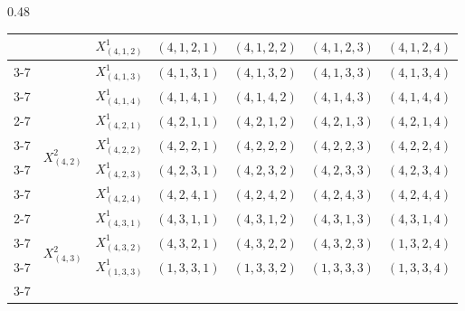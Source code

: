 \documentclass[12pt]{article}
\begin{document}
\begin{table}[p]
\begin{subtable}[t]{0.48\textwidth}
{\begin{tabular}{|c|c|c|c|c|c|c|}
                                  &                                  & $X_{(4,1,2)}^{1}$ &\cellcolor{blue!40} $(4,1,2,1)$ &\cellcolor{green!40} $(4,1,2,2)$ &\cellcolor{yellow!40} $(4,1,2,3)$ &\cellcolor{red!40} $(4,1,2,4)$ \\ \cline{3-7}
                                  &                                  & $X_{(4,1,3)}^{1}$ & \cellcolor{green!40}$(4,1,3,1)$ & \cellcolor{yellow!40} $(4,1,3,2)$ & \cellcolor{red!40} $(4,1,3,3)$ & \cellcolor{blue!40} $(4,1,3,4)$ \\ \cline{3-7}
                                  &                                  & $X_{(4,1,4)}^{1}$ & \cellcolor{yellow!40}$(4,1,4,1)$ & \cellcolor{red!40} $(4,1,4,2)$ & \cellcolor{blue!40} $(4,1,4,3)$ & \cellcolor{green!40} $(4,1,4,4)$ \\ \cline{2-7}
                                  & \multirow{4}{*}{$X_{(4,2)}^{2}$} & $X_{(4,2,1)}^{1}$ & \cellcolor{blue!40}$(4,2,1,1)$ & \cellcolor{green!40}$(4,2,1,2)$ &\cellcolor{yellow!40} $(4,2,1,3)$ & \cellcolor{red!40}$(4,2,1,4)$ \\ \cline{3-7}
                                  &                                  & $X_{(4,2,2)}^{1}$ & \cellcolor{green!40}$(4,2,2,1)$ & \cellcolor{yellow!40} $(4,2,2,2)$ & \cellcolor{red!40} $(4,2,2,3)$ & \cellcolor{blue!40} $(4,2,2,4)$ \\ \cline{3-7}
                                  &                                  & $X_{(4,2,3)}^{1}$ & \cellcolor{yellow!40}$(4,2,3,1)$ & \cellcolor{red!40} $(4,2,3,2)$ & \cellcolor{blue!40} $(4,2,3,3)$ & \cellcolor{green!40} $(4,2,3,4)$ \\ \cline{3-7}
                                  &                                  & $X_{(4,2,4)}^{1}$ & \cellcolor{red!40}$(4,2,4,1)$ & \cellcolor{blue!40} $(4,2,4,2)$ & \cellcolor{green!40} $(4,2,4,3)$ & \cellcolor{yellow!40} $(4,2,4,4)$ \\ \cline{2-7}
                                  & \multirow{4}{*}{$X_{(4,3)}^{2}$} & $X_{(4,3,1)}^{1}$ & \cellcolor{green!40}$(4,3,1,1)$ & \cellcolor{yellow!40} $(4,3,1,2)$ & \cellcolor{red!40} $(4,3,1,3)$ & \cellcolor{blue!40}$(4,3,1,4)$ \\ \cline{3-7}
                                  &                                  & $X_{(4,3,2)}^{1}$ & \cellcolor{yellow!40} $(4,3,2,1)$ & \cellcolor{red!40}$(4,3,2,2)$ &\cellcolor{blue!40} $(4,3,2,3)$ & \cellcolor{green!40}$(1,3,2,4)$ \\ \cline{3-7}
                                  &                                  & $X_{(1,3,3)}^{1}$ & \cellcolor{red!40}$(1,3,3,1)$ & \cellcolor{blue!40}$(1,3,3,2)$ & \cellcolor{green!40}$(1,3,3,3)$ &\cellcolor{yellow!40} $(1,3,3,4)$ \\ \cline{3-7}

\end{tabular}}
\end{subtable}
\end{table}
\end{document}
